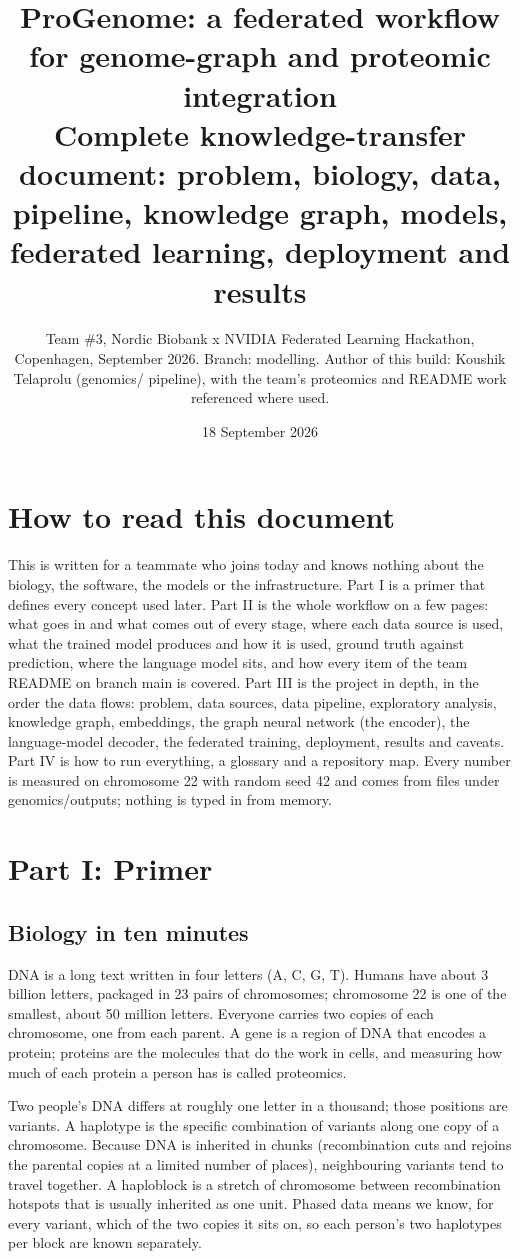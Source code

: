 \documentclass[11pt,a4paper]{article}
\title{ProGenome: a federated workflow for genome-graph and proteomic integration\\[6pt]\large Complete knowledge-transfer document: problem, biology, data, pipeline, knowledge graph, models, federated learning, deployment and results}
\author{Team \#3, Nordic Biobank x NVIDIA Federated Learning Hackathon, Copenhagen, September 2026. Branch: modelling. Author of this build: Koushik Telaprolu (genomics/ pipeline), with the team's proteomics and README work referenced where used.}
\date{18 September 2026}
\begin{document}
\maketitle
\tableofcontents
\newpage

\section{How to read this document}

This is written for a teammate who joins today and knows nothing about the biology, the software, the models or the infrastructure. Part I is a primer that defines every concept used later. Part II is the whole workflow on a few pages: what goes in and what comes out of every stage, where each data source is used, what the trained model produces and how it is used, ground truth against prediction, where the language model sits, and how every item of the team README on branch main is covered. Part III is the project in depth, in the order the data flows: problem, data sources, data pipeline, exploratory analysis, knowledge graph, embeddings, the graph neural network (the encoder), the language-model decoder, the federated training, deployment, results and caveats. Part IV is how to run everything, a glossary and a repository map. Every number is measured on chromosome 22 with random seed 42 and comes from files under genomics/outputs; nothing is typed in from memory.

\section{Part I: Primer}

\subsection{Biology in ten minutes}

DNA is a long text written in four letters (A, C, G, T). Humans have about 3 billion letters, packaged in 23 pairs of chromosomes; chromosome 22 is one of the smallest, about 50 million letters. Everyone carries two copies of each chromosome, one from each parent. A gene is a region of DNA that encodes a protein; proteins are the molecules that do the work in cells, and measuring how much of each protein a person has is called proteomics.

Two people's DNA differs at roughly one letter in a thousand; those positions are variants. A haplotype is the specific combination of variants along one copy of a chromosome. Because DNA is inherited in chunks (recombination cuts and rejoins the parental copies at a limited number of places), neighbouring variants tend to travel together. A haploblock is a stretch of chromosome between recombination hotspots that is usually inherited as one unit. Phased data means we know, for every variant, which of the two copies it sits on, so each person's two haplotypes per block are known separately.
\end{document}
